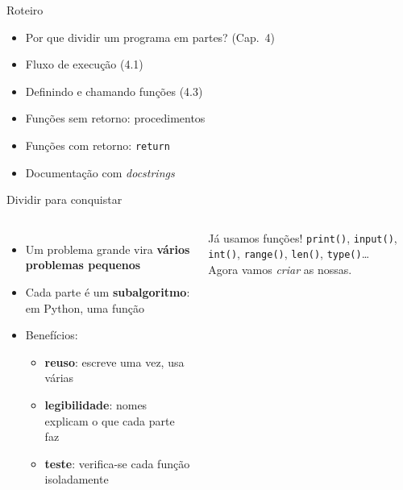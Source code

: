 \documentclass[aspectratio=169,10pt,t]{beamer}
\begin{document}
\capa

\begin{frame}{Roteiro}
  \begin{itemize}
    \item Por que dividir um programa em partes? (Cap.~4)
    \item Fluxo de execução (4.1)
    \item Definindo e chamando funções (4.3)
    \item Funções sem retorno: procedimentos
    \item Funções com retorno: \texttt{return}
    \item Documentação com \emph{docstrings}
  \end{itemize}
\end{frame}

\begin{frame}{Dividir para conquistar}
  \begin{columns}[T]
    \begin{itemize}
      \item Um problema grande vira \textbf{vários problemas pequenos}
      \item Cada parte é um \textbf{subalgoritmo}: em Python, uma \alert{função}
      \item Benefícios:
      \begin{itemize}\small
        \item \textbf{reuso}: escreve uma vez, usa várias
        \item \textbf{legibilidade}: nomes explicam o que cada parte faz
        \item \textbf{teste}: verifica-se cada função isoladamente
      \end{itemize}
    \end{itemize}
    \begin{exampleblock}{Já usamos funções!}
      \texttt{print()}, \texttt{input()}, \texttt{int()}, \texttt{range()}, \texttt{len()}, \texttt{type()}\ldots\\
      Agora vamos \emph{criar} as nossas.
    \end{exampleblock}
  \end{columns}
\end{frame}
\end{document}
